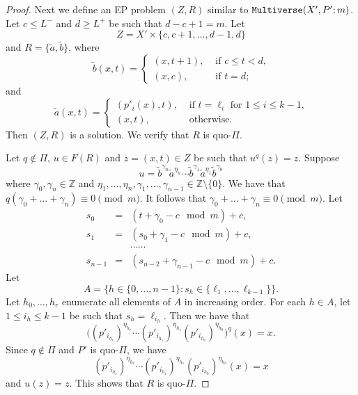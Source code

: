 \documentclass[10pt,a4paper]{amsart}
\theoremstyle{definition}
\theoremstyle{definition}
\numberwithin{equation}{section}
\begin{document}
\begin{proof}
Next we define an EP problem $(Z, R)$ similar to $\mbox{\tt Multiverse}(X', P';m)$. Let $c\leq L^-$ and $d\geq L^+$ be such that $d-c+1=m$. Let $$Z=X'\times \{c, c+1,\dots, d-1, d\}$$ and $R=\{\tilde{a}, \tilde{b}\}$, where
$$ \tilde{b}(x, t)=\left\{\begin{array}{ll} (x, t+1), & \mbox{ if $c\leq t<d$,} \\
(x, c), & \mbox{ if $t=d$;}\end{array}\right.
$$
and
$$ \tilde{a}(x, t)=\left\{\begin{array}{ll} (p'_i(x), t), & \mbox{ if $t=\ell_i$ for $1\leq i\leq k-1$,} \\
(x, t), & \mbox{ otherwise.}
\end{array}\right.
$$
Then $(Z,R)$ is a solution. We verify that $R$ is quo-$\Pi$. 

Let $q\not\in\Pi$, $u\in F(R)$ and $z=(x, t)\in Z$ be such that $u^q(z)=z$. Suppose 
$$ u=\tilde{b}^{\gamma_n}\tilde{a}^{\eta_n}\cdots \tilde{b}^{\gamma_1}\tilde{a}^{\eta_1}\tilde{b}^{\gamma_0} $$
where $\gamma_0, \gamma_n\in\mathbb{Z}$ and $\eta_1, \dots, \eta_n, \gamma_1,\dots, \gamma_{n-1}\in \mathbb{Z}\setminus\{0\}$. We have that $q(\gamma_0+\dots+\gamma_n)\equiv 0\pmod{m}$. It follows that $\gamma_0+\dots+\gamma_n\equiv 0\pmod{m}$. Let 
$$\begin{array}{rcl} s_0&=&(t+\gamma_0-c\!\!\!\!\mod m)+c, \\
s_1&=&(s_0+\gamma_1-c\!\!\!\!\mod m)+c,  \\
&&\cdots\cdots \\
s_{n-1}&=&(s_{n-2}+\gamma_{n-1}-c\!\!\!\!\mod m)+c. 
\end{array}$$
Let 
$$ A=\big\{ h\in\{0,\dots, n-1\}\colon s_h\in\{\ell_1,\dots, \ell_{k-1}\}\big\}. $$
Let $h_0,\dots,h_r$ enumerate all elements of $A$ in increasing order. For each $h\in A$, let $1\leq i_h\leq k-1$ be such that $s_h=\ell_{i_h}$. Then we have that
$$ \big({(p'_{i_{h_r}})}^{\eta_{h_r}}\cdots {(p'_{i_{h_1}})}^{\eta_{h_1}}{(p'_{i_{h_0}})}^{\eta_{h_0}}\big)^q(x)=x. $$
Since $q\not\in\Pi$ and $P'$ is quo-$\Pi$, we have
$$ {(p'_{i_{h_r}})}^{\eta_{h_r}}\cdots {(p'_{i_{h_1}})}^{\eta_{h_1}}{(p'_{i_{h_0}})}^{\eta_{h_0}}(x)=x $$
and $u(z)=z$. This shows that $R$ is quo-$\Pi$.


\end{proof}
\end{document}
